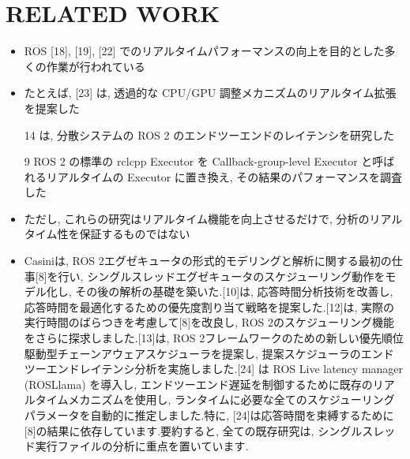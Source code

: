 
\section{RELATED WORK}
\label{sec: related work}


\begin{frame}{}
    \begin{itemize}
        \item ROS [18], [19], [22] でのリアルタイムパフォーマンスの向上を目的とした多くの作業が行われている
\item たとえば, [23] は, 透過的な CPU/GPU 調整メカニズムのリアルタイム拡張を提案した
\item [14] は, 分散システムの ROS 2 のエンドツーエンドのレイテンシを研究した
\item [9] ROS 2 の標準の rclcpp Executor を Callback-group-level Executor と呼ばれるリアルタイムの Executor に置き換え, その結果のパフォーマンスを調査した
\item ただし, これらの研究はリアルタイム機能を向上させるだけで, 分析のリアルタイム性を保証するものではない
    \end{itemize}
\end{frame}

\begin{frame}{}
    \begin{itemize}
        \item Casiniは, ROS 2エグゼキュータの形式的モデリングと解析に関する最初の仕事[8]を行い, シングルスレッドエグゼキュータのスケジューリング動作をモデル化し, その後の解析の基礎を築いた.[10]は, 応答時間分析技術を改善し, 応答時間を最適化するための優先度割り当て戦略を提案した.[12]は, 実際の実行時間のばらつきを考慮して[8]を改良し, ROS 2のスケジューリング機能をさらに探求しました.[13]は, ROS 2フレームワークのための新しい優先順位駆動型チェーンアウェアスケジューラを提案し, 提案スケジューラのエンドツーエンドレイテンシ分析を実施しました.[24] は ROS Live latency manager (ROSLlama) を導入し, エンドツーエンド遅延を制御するために既存のリアルタイムメカニズムを使用し, ランタイムに必要な全てのスケジューリングパラメータを自動的に推定しました.特に, [24]は応答時間を束縛するために[8]の結果に依存しています.要約すると, 全ての既存研究は, シングルスレッド実行ファイルの分析に重点を置いています.
    \end{itemize}
\end{frame}

